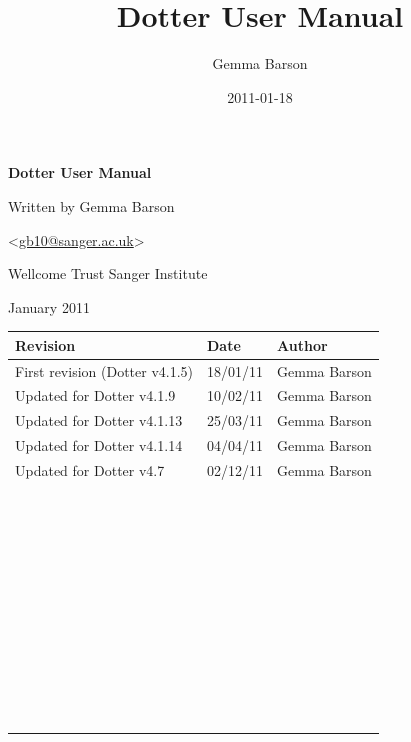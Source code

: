\documentclass[letterpaper]{article}
\title{Dotter User Manual}
\author{Gemma Barson}
\date{2011-01-18}
\begin{document}
\setcounter{page}{1}\pagestyle{Standard}

\thispagestyle{FirstPage}
{\centering\sffamily\bfseries\color[rgb]{0.0,0.27058825,0.5254902}
\Huge\bf{Dotter User Manual}
\par}

\bigskip

{\centering
\large{Written by Gemma Barson}
\par}
{\centering
{\textless}\href{mailto:gb10@sanger.ac.uk}{gb10@sanger.ac.uk}{\textgreater}
\par}

\bigskip

{\centering
\large{Wellcome Trust Sanger Institute}
\par}
{ January 2011
\par}




\begin{center}
\tablehead{}
\begin{supertabular}{|m{8.073cm}|m{3.2849998cm}|m{3.282cm}|}
\hline
\bfseries Revision &
\bfseries Date &
\bfseries Author\\\hline
 First revision (Dotter v4.1.5) &
 18/01/11 &
 Gemma Barson\\\hline
 Updated for Dotter v4.1.9 &
 10/02/11 &
 Gemma Barson\\\hline
 Updated for Dotter v4.1.13 &
 25/03/11 &
 Gemma Barson\\\hline
 Updated for Dotter v4.1.14 &
 04/04/11 &
 Gemma Barson\\\hline
 Updated for Dotter v4.7 &
 02/12/11 &
 Gemma Barson\\\hline
~
 &
~
 &
~
\\\hline
~
 &
~
 &
~
\\\hline
~
 &
~
 &
~
\\\hline
~
 &
~
 &
~
\\\hline
~
 &
~
 &
~
\\\hline
~
 &
~
 &
~
\\\hline
~
 &
~
 &
~
\\\hline
~
 &
~
 &
~
\\\hline
~
 &
~
 &
~
\\\hline
~
 &
~
 &
~
\\\hline
\end{supertabular}
\end{center}
\end{document}
